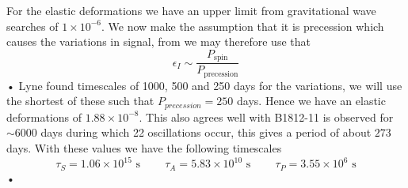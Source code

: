 \documentclass[11pt]{article}
\numberwithin{equation}{section}
\numberwithin{figure}{section}
\numberwithin{table}{section}
\begin{document}
For the elastic deformations we have an upper limit from gravitational wave searches of $1\times10^{-6}$. We now make the assumption that it is precession which causes the variations in signal, from \citet{Jones2001} we may therefore use that 
\begin{equation}
\epsilon_{I} \sim  \frac{P_{\textrm{spin}}}{P_{\textrm{precession}}}
\end{equation}•
Lyne found timescales of 1000, 500 and 250 days for the variations, we will use the shortest of these such that $P_{precession}=250$ days. Hence we have an elastic deformations of $1.88 \times10^{-8}$. This also agrees well with \citet{Lyne2010} B1812-11 is observed for $\sim6000$ days during which 22 oscillations occur, this gives a period of about $273$ days. 
With these values we have the following timescales
\begin{equation*}
\tau_{S}=1.06\times10^{15} \textrm{ s} \;\;\;\; \;\;\;\; \tau_{A}=5.83\times10^{10} \textrm{ s} \;\;\;\; \;\;\;\; \tau_{P}=3.55\times10^{6} \textrm{ s}
\end{equation*}•
\end{document}
